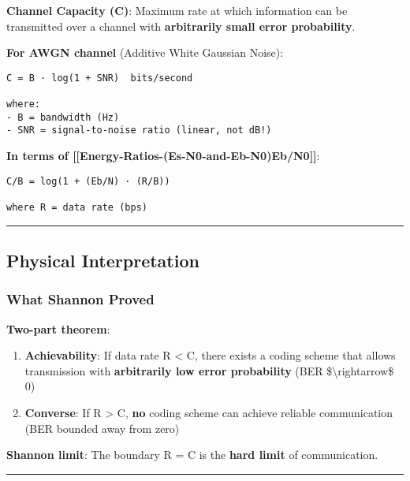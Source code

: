 \textbf{Channel Capacity (C)}: Maximum rate at which information can be
transmitted over a channel with \textbf{arbitrarily small error
probability}.

\textbf{For AWGN channel} (Additive White Gaussian Noise):

\begin{verbatim}
C = B · log(1 + SNR)  bits/second

where:
- B = bandwidth (Hz)
- SNR = signal-to-noise ratio (linear, not dB!)
\end{verbatim}

\textbf{In terms of
{[}{[}Energy-Ratios-(Es-N0-and-Eb-N0)\textbar Eb/N0{]}{]}}:

\begin{verbatim}
C/B = log(1 + (Eb/N) · (R/B))

where R = data rate (bps)
\end{verbatim}

\begin{center}\rule{0.5\linewidth}{0.5pt}\end{center}

\subsection{\texorpdfstring{ Physical
Interpretation}{ Physical Interpretation}}\label{physical-interpretation}

\subsubsection{What Shannon Proved}\label{what-shannon-proved}

\textbf{Two-part theorem}:

\begin{enumerate}
\def\labelenumi{\arabic{enumi}.}
\item
  \textbf{Achievability}: If data rate R \textless{} C, there exists a
  coding scheme that allows transmission with \textbf{arbitrarily low
  error probability} (BER \$\textbackslash rightarrow\$ 0)
\item
  \textbf{Converse}: If R \textgreater{} C, \textbf{no} coding scheme
  can achieve reliable communication (BER bounded away from zero)
\end{enumerate}

\textbf{Shannon limit}: The boundary R = C is the \textbf{hard limit} of
communication.

\begin{center}\rule{0.5\linewidth}{0.5pt}\end{center}

